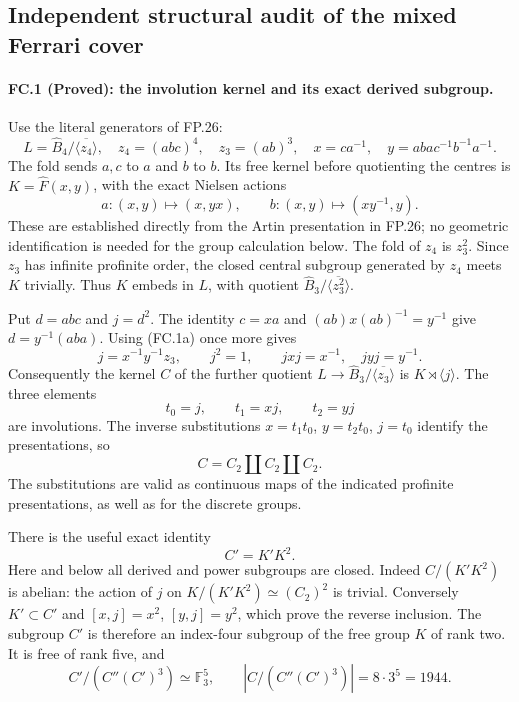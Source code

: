 \subsection*{Independent structural audit of the mixed Ferrari cover}

\paragraph{FC.1 (Proved): the involution kernel and its exact derived subgroup.}
Use the literal generators of FP.26:
\[
 L=\widehat B_4/\overline{\langle z_4\rangle},\quad
 z_4=(abc)^4,\quad z_3=(ab)^3,\quad
 x=ca^{-1},\quad y=aba c^{-1}b^{-1}a^{-1}.
\]
The fold sends $a,c$ to $a$ and $b$ to $b$. Its free kernel
before quotienting the centres is $K=\widehat F(x,y)$, with
the exact Nielsen actions
\[
 a:(x,y)\mapsto(x,yx),\qquad
 b:(x,y)\mapsto(xy^{-1},y).
 \tag{FC.1a}
\]
These are established directly from the Artin presentation in FP.26;
no geometric identification is needed for the group calculation below.
The fold of $z_4$ is $z_3^2$. Since $z_3$ has infinite
profinite order, the closed central subgroup generated by $z_4$
meets $K$ trivially. Thus $K$ embeds in $L$, with quotient
$\widehat B_3/\overline{\langle z_3^2\rangle}$.

Put $d=abc$ and $j=d^2$. The identity $c=xa$ and
$(ab)x(ab)^{-1}=y^{-1}$ give $d=y^{-1}(aba)$.
Using (FC.1a) once more gives
\[
       j=x^{-1}y^{-1}z_3,\qquad
       j^2=1,\qquad jxj=x^{-1},\quad jyj=y^{-1}.
 \tag{FC.1b}
\]
Consequently the kernel $C$ of the further quotient
$L\to\widehat B_3/\overline{\langle z_3\rangle}$ is
$K\rtimes\langle j\rangle$. The three elements
\[
             t_0=j,\qquad t_1=xj,\qquad t_2=yj
\]
are involutions. The inverse substitutions
$x=t_1t_0$, $y=t_2t_0$, $j=t_0$ identify the presentations,
so
\[
              C=C_2\amalg C_2\amalg C_2.
 \tag{FC.1c}
\]
The substitutions are valid as continuous maps of the indicated
profinite presentations, as well as for the discrete groups.

There is the useful exact identity
\[
                    \boxed{\ C'=K'K^2.\ }
 \tag{FC.1d}
\]
Here and below all derived and power subgroups are closed.
Indeed $C/(K'K^2)$ is abelian: the action of $j$ on
$K/(K'K^2)\simeq(C_2)^2$ is trivial. Conversely $K'\subset C'$
and $[x,j]=x^2$, $[y,j]=y^2$, which prove the reverse inclusion.
The subgroup $C'$ is therefore an index-four subgroup of the
free group $K$ of rank two. It is free of rank five, and
\[
  C'/(C''(C')^3)\simeq\mathbb F_3^5,\qquad
  |C/(C''(C')^3)|=8\cdot3^5=1944.
 \tag{FC.1e}
\]

